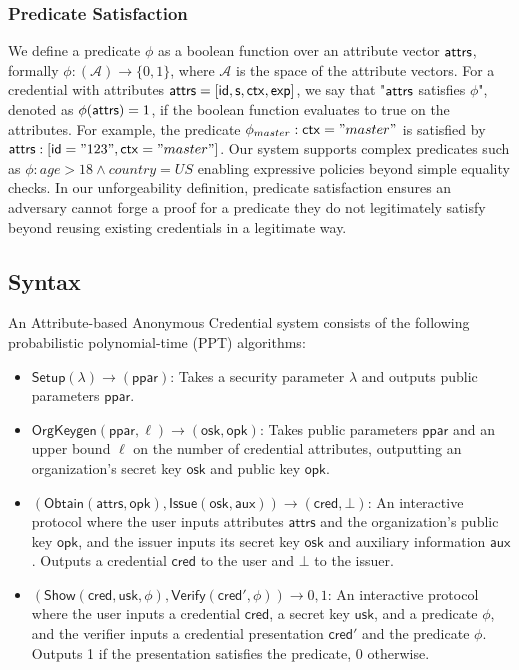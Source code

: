 \subsubsection*{Predicate Satisfaction}
We define a predicate $\phi$ as a boolean function over an attribute vector $\mathsf{attrs}$, formally  $\phi: (\mathcal{A}) \rightarrow \{0,1\}$, where $\mathcal{A}$ is the space of the attribute vectors. 
For a credential with attributes $\mathsf{attrs} = [\mathsf{id}, \mathsf{s}, \mathsf{ctx}, \mathsf{exp}]$, we say that "$\mathsf{attrs}$ satisfies $\phi$", denoted as $\phi(\mathsf{attrs}) = 1$, if the boolean function evaluates to true on the attributes.
For example, the predicate $\phi_{master}:\mathsf{ctx} = "master"$ is satisfied by $\mathsf{attrs}: [\mathsf{id}="123", \mathsf{ctx}="master"]$. Our system supports complex predicates such as $\phi: age > 18 \wedge country = US$ enabling expressive policies beyond simple equality checks. In our unforgeability definition, predicate satisfaction ensures an adversary cannot forge a proof for a predicate they do not legitimately satisfy beyond reusing existing credentials in a legitimate way.


\subsection{Syntax}
\begin{definition}\label{chap2_abc_system_definition}
An Attribute-based Anonymous Credential system consists of the following probabilistic polynomial-time (PPT) algorithms:
\begin{itemize}
\item $\mathsf{Setup}(\lambda) \to (\mathsf{ppar})$: Takes a security parameter $\lambda$ and outputs public parameters $\mathsf{ppar}$.

\item $\mathsf{OrgKeygen}(\mathsf{ppar}, \ell) \to (\mathsf{osk}, \mathsf{opk})$: Takes public parameters $\mathsf{ppar}$ and an upper bound $\ell$ on the number of credential attributes, outputting an organization's secret key $\mathsf{osk}$ and public key $\mathsf{opk}$.

\item $(\mathsf{Obtain}(\mathsf{attrs}, \mathsf{opk}), \mathsf{Issue}(\mathsf{osk}, \mathsf{aux})) \to (\mathsf{cred}, \bot)$: An interactive protocol where the user inputs attributes $\mathsf{attrs}$ and the organization's public key $\mathsf{opk}$, and the issuer inputs its secret key $\mathsf{osk}$ and auxiliary information $\mathsf{aux}$. Outputs a credential $\mathsf{cred}$ to the user and $\bot$ to the issuer.

\item $(\mathsf{Show}(\mathsf{cred}, \mathsf{usk}, \phi), \mathsf{Verify}(\mathsf{cred}', \phi)) \to {0,1}$: An interactive protocol where the user inputs a credential $\mathsf{cred}$, a secret key $\mathsf{usk}$, and a predicate $\phi$, and the verifier inputs a credential presentation $\mathsf{cred}'$ and the predicate $\phi$. Outputs 1 if the presentation satisfies the predicate, 0 otherwise.
\end{itemize}
\end{definition}

